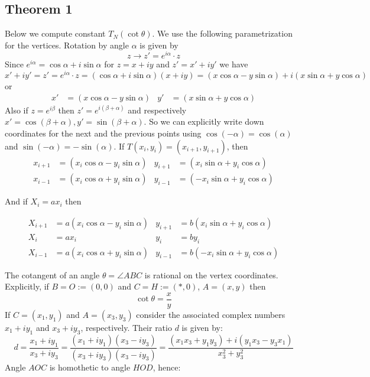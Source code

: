 \subsection{Theorem 1}

Below we compute constant $T_N(\cot\theta)$. We use the following parametrization for the vertices.
Rotation by angle $\alpha$ is given by
\[ z\to z' = e^{i \alpha} \cdot z \]
Since $e^{i \alpha} = \cos \alpha + i \sin \alpha$
for $z = x + i y$ and $z'=x'+iy'$ we have
\[
   x'+iy' = z' 
 = e^{i \alpha} \cdot z
 = (\cos \alpha + i \sin \alpha) (x + i y) 
 = (x \cos \alpha - y \sin \alpha) + i (x \sin \alpha + y \cos \alpha)
\] 
or
\begin{align*} x' &= (x \cos \alpha - y \sin \alpha)    &     y' &= (x \sin \alpha + y \cos \alpha) \end{align*}
Also if $z = e^{i \beta}$ then $z' = e^{i (\beta+\alpha)}$ and respectively $x'=\cos(\beta+\alpha), y'=\sin(\beta+\alpha)$.
So we can explicitly write down coordinates for the next and the previous points using $\cos(-\alpha)=\cos(\alpha)$ and $\sin(-\alpha)=-\sin(\alpha)$.
If $T (x_i,y_i) = (x_{i+1},y_{i+1})$, then
\begin{align*} 
x_{i+1} &= (x_i \cos \alpha - y_i \sin \alpha)    &     y_{i+1} &= (x_i \sin \alpha + y_i \cos \alpha)  \\
x_{i-1} &= (x_i \cos \alpha + y_i \sin \alpha)    &     y_{i-1} &= (-x_i \sin \alpha + y_i \cos \alpha)  
\end{align*}

And if $X_i = a x_i$ then

\begin{align} 
X_{i+1} &= a(x_i \cos \alpha - y_i \sin \alpha) & y_{i+1} &= b( x_i \sin \alpha + y_i \cos \alpha) \nonumber \\
X_i &= a x_i & y_i &= b y_i \label{eq:scaled-dynamics} \\
X_{i-1} &= a(x_i \cos \alpha + y_i \sin \alpha)   &    y_{i-1} &= b(-x_i \sin \alpha + y_i \cos \alpha) \nonumber
\end{align}

The cotangent of an angle $\theta=\angle{ABC}$ is rational on the vertex coordinates.
Explicitly, if $B=O:=(0,0)$ and $C=H:=(*,0)$, $A=(x,y)$ then
\[ \cot\theta = \frac{x}{y} \]
If $C=(x_1,y_1)$ and $A=(x_3,y_3)$ consider the associated complex numbers $x_1 + i y_1$ and $x_3 + i y_3$, respectively. Their ratio $d$ is given by:
\[ d 
 = \frac{x_1 + i y_1}{x_3 + i y_3} 
 = \frac{(x_1 + i y_1)(x_3 - i y_3)}{(x_3 + i y_3)(x_3 - i y_3)} 
 = \frac{(x_1 x_3 + y_1 y_3) + i (y_1 x_3 - y_3 x_1)}{x_3^2 + y_3^2}
\]
Angle $AOC$ is homothetic to angle $HOD$, hence:


